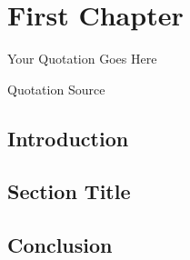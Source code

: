 
\chapter{First Chapter}
\epigraph{Your Quotation Goes Here}{Quotation Source}

\section{Introduction}
\lipsum[5-8]

\section{Section Title}
\lipsum[11-16]

\section{Conclusion}
\lipsum[58]